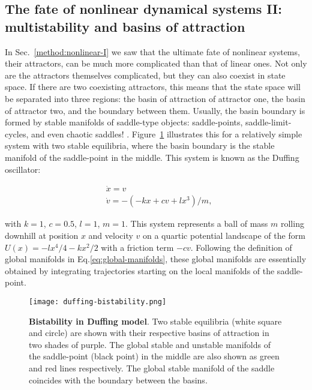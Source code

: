\subsection{The fate of nonlinear dynamical systems II: multistability and basins of attraction}
In Sec.~\ref{method:nonlinear-I} we saw that the ultimate fate of nonlinear systems, their attractors, can be much more complicated than that of linear ones. Not only are the attractors themselves complicated, but they can also coexist in state space. If there are two coexisting attractors, this means that the state space will be separated into three regions: the basin of attraction of attractor one, the basin of attractor two, and the boundary between them. Usually, the basin boundary is formed by stable manifolds of saddle-type objects: saddle-points, saddle-limit-cycles, and even chaotic saddles! \cite{pisarchik2022multistability}. Figure~\ref{fig:bistability-duffing} illustrates this for a relatively simple system with two stable equilibria, where the basin boundary is the stable manifold of the saddle-point in the middle. This system is known as the Duffing oscillator: 

\begin{align}
    &\dot{x} = v\\
    &\dot{v} = -(-kx + cv + lx^3)/m,
\end{align}

with $k = 1$, $c=0.5$, $l=1$, $m=1$. This system represents a ball of mass $m$ rolling downhill at position $x$ and velocity $v$ on a quartic potential landscape of the form $U(x) = -lx^4/4 - kx^2/2$ with a friction term $-cv$. Following the definition of global manifolds in Eq.\ref{eq:global-manifolds}, these global manifolds are essentially obtained by integrating trajectories starting on the local manifolds of the saddle-point. 
%
\begin{figure}[htb!]
    \centering 
    \texttt{[image: duffing-bistability.png]}
    \caption{\textbf{Bistability in Duffing model}. Two stable equilibria (white square and circle) are shown with their respective basins of attraction in two shades of purple. The global stable and unstable manifolds of the saddle-point (black point) in the middle are also shown as green and red lines respectively. The global stable manifold of the saddle coincides with the boundary between the basins.}
    \label{fig:bistability-duffing}
\end{figure}


